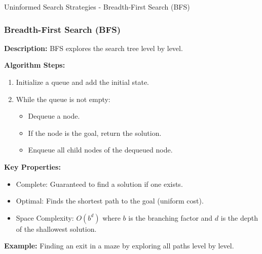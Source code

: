 \documentclass[aspectratio=169]{beamer}
\begin{document}
\begin{frame}[fragile]{Uninformed Search Strategies - Breadth-First Search (BFS)}
    \frametitle{Breadth-First Search (BFS)}
    
    \textbf{Description:}  
    BFS explores the search tree level by level.

    \textbf{Algorithm Steps:}
    \begin{enumerate}
        \item Initialize a queue and add the initial state.
        \item While the queue is not empty:
        \begin{itemize}
            \item Dequeue a node.
            \item If the node is the goal, return the solution.
            \item Enqueue all child nodes of the dequeued node.
        \end{itemize}
    \end{enumerate}

    \textbf{Key Properties:}
    \begin{itemize}
        \item Complete: Guaranteed to find a solution if one exists.
        \item Optimal: Finds the shortest path to the goal (uniform cost).
        \item Space Complexity: \(O(b^d)\) where \(b\) is the branching factor and \(d\) is the depth of the shallowest solution.
    \end{itemize}

    \textbf{Example:}  
    Finding an exit in a maze by exploring all paths level by level.
\end{frame}
\end{document}
